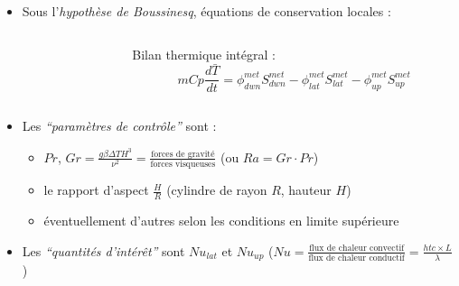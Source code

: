 \begin{frame}[fragile]
\begin{columns}[T]
\begin{column}{0.7\textwidth}
\begin{scriptsize}
\begin{itemize}
    \end{itemize} 
    \end{scriptsize}
    \end{column}
\end{columns}
\begin{itemize}
\item Sous l'\emph{hypothèse de Boussinesq}, équations de conservation locales :
\begin{columns}[T]
    \begin{column}{0.58\textwidth}
    \end{column}
    \begin{column}{0.42\textwidth}
\begin{scriptsize}
    Bilan thermique intégral :
    \begin{equation*} mCp \frac{d\bar{T}}{dt} = \phi^{met}_{dwn} S^{met}_{dwn} - \phi^{met}_{lat} S^{met}_{lat} - \phi^{met}_{up} S^{met}_{up} \end{equation*}
\end{scriptsize}
    \end{column}
\end{columns}
\item Les \emph{``paramètres de contrôle''} sont :
\begin{itemize}
\item $Pr$, $Gr=\frac{g\beta\Delta T H^3}{\nu^2}=\frac{\text{forces de gravité}}{\text{forces visqueuses}}$ (ou $Ra=Gr \cdot Pr$)
\item le rapport d'aspect $\frac{H}{R}$ (cylindre de rayon $R$, hauteur $H$)
\item éventuellement d'autres selon les conditions en limite supérieure
\end{itemize}
\item Les \emph{``quantités d'intérêt''} sont $Nu_{lat}$ et $Nu_{up}$ ($Nu=\frac{\text{flux de chaleur convectif}}{\text{flux de chaleur conductif}}=\frac{htc \times L}{\lambda}$ )
\end{itemize}
\end{frame}
